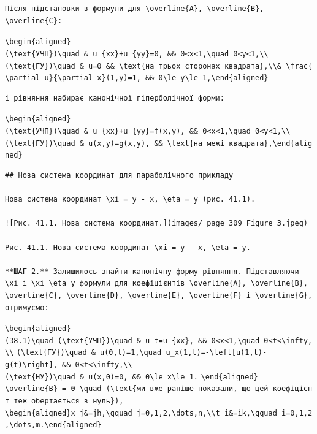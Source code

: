 \documentclass[
  ukrainian,
]{article}
\begin{document}
\begin{verbatim}
Після підстановки в формули для \overline{A}, \overline{B}, \overline{C}:
\end{verbatim}

\texttt{\textbackslash{}begin\{aligned\}(\textbackslash{}text\{УЧП\})\textbackslash{}quad\ \&\ u\_\{xx\}+u\_\{yy\}=0,\ \&\&\ 0\textless{}x\textless{}1,\textbackslash{}quad\ 0\textless{}y\textless{}1,\textbackslash{}\textbackslash{}(\textbackslash{}text\{ГУ\})\textbackslash{}quad\ \&\ u=0\ \&\&\ \textbackslash{}text\{на\ трьох\ сторонах\ квадрата\},\textbackslash{}\textbackslash{}\&\ \textbackslash{}frac\{\textbackslash{}partial\ u\}\{\textbackslash{}partial\ x\}(1,y)=1,\ \&\&\ 0\textbackslash{}le\ y\textbackslash{}le\ 1,\textbackslash{}end\{aligned\}}

\begin{verbatim}
і рівняння набирає канонічної гіперболічної форми:
\end{verbatim}

\texttt{\textbackslash{}begin\{aligned\}(\textbackslash{}text\{УЧП\})\textbackslash{}quad\ \&\ u\_\{xx\}+u\_\{yy\}=f(x,y),\ \&\&\ 0\textless{}x\textless{}1,\textbackslash{}quad\ 0\textless{}y\textless{}1,\textbackslash{}\textbackslash{}(\textbackslash{}text\{ГУ\})\textbackslash{}quad\ \&\ u(x,y)=g(x,y),\ \&\&\ \textbackslash{}text\{на\ межі\ квадрата\},\textbackslash{}end\{aligned\}}

\begin{verbatim}
## Нова система координат для параболічного прикладу

Нова система координат \xi = y - x, \eta = y (рис. 41.1).

![Рис. 41.1. Нова система координат.](images/_page_309_Figure_3.jpeg)

Рис. 41.1. Нова система координат \xi = y - x, \eta = y.

**ШАГ 2.** Залишилось знайти канонічну форму рівняння. Підставляючи \xi і \xi \eta у формули для коефіцієнтів \overline{A}, \overline{B}, \overline{C}, \overline{D}, \overline{E}, \overline{F} і \overline{G}, отримуємо:
\end{verbatim}

\texttt{\textbackslash{}begin\{aligned\}}
\texttt{(38.1)\textbackslash{}quad\ (\textbackslash{}text\{УЧП\})\textbackslash{}quad\ \&\ u\_t=u\_\{xx\},\ \&\&\ 0\textless{}x\textless{}1,\textbackslash{}quad\ 0\textless{}t\textless{}\textbackslash{}infty,\textbackslash{}\textbackslash{}}
\texttt{(\textbackslash{}text\{ГУ\})\textbackslash{}quad\ \&\ u(0,t)=1,\textbackslash{}quad\ u\_x(1,t)=-\textbackslash{}left{[}u(1,t)-g(t)\textbackslash{}right{]},\ \&\&\ 0\textless{}t\textless{}\textbackslash{}infty,\textbackslash{}\textbackslash{}}
\texttt{(\textbackslash{}text\{НУ\})\textbackslash{}quad\ \&\ u(x,0)=0,\ \&\&\ 0\textbackslash{}le\ x\textbackslash{}le\ 1.}
\texttt{\textbackslash{}end\{aligned\}}
\texttt{\textbackslash{}overline\{B\}\ =\ 0\ \textbackslash{}quad\ (\textbackslash{}text\{ми\ вже\ раніше\ показали,\ що\ цей\ коефіцієнт\ теж\ обертається\ в\ нуль\}),}
\texttt{\textbackslash{}begin\{aligned\}x\_j\&=jh,\textbackslash{}qquad\ j=0,1,2,\textbackslash{}dots,n,\textbackslash{}\textbackslash{}t\_i\&=ik,\textbackslash{}qquad\ i=0,1,2,\textbackslash{}dots,m.\textbackslash{}end\{aligned\}}
\end{document}
